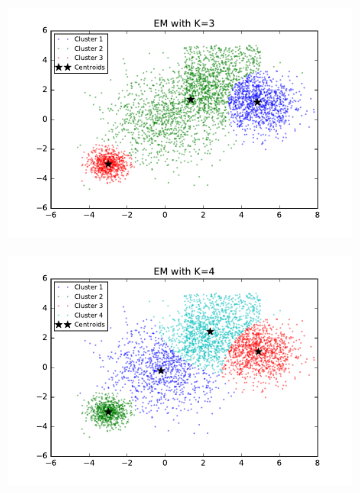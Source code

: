 \begin{description}
\begin{description}
\begin{figure}[!h]
        \centering
        \begin{subfigure}[b]{0.475\textwidth}
            \centering
            \includegraphics[width=\textwidth]{./figures/bigClustering_EM_3.pdf}
        \end{subfigure}
        \hfill
        \begin{subfigure}[b]{0.475\textwidth}  
            \centering 
            \includegraphics[width=\textwidth]{./figures/bigClustering_EM_4.pdf}
        \end{subfigure}
        \begin{subfigure}[b]{0.475\textwidth}  
            \centering 

\end{subfigure}
\end{figure}
\end{description}
\end{description}
